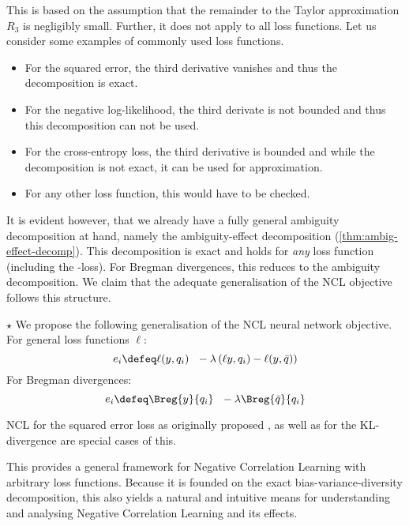 \documentclass[../main.tex]{subfiles}
\begin{document}
This is based on the assumption that the remainder to the Taylor approximation $R_{3}$ is negligibly small. Further, it does not apply to all loss functions. Let us consider some examples of commonly used loss functions.
\begin{itemize}
\item For the squared error, the third derivative vanishes and thus the decomposition is exact.
\item For the negative log-likelihood,
the third derivate is not bounded and thus this decomposition can not be used.
\item For the cross-entropy loss, 
the third derivative is bounded and while the decomposition is not exact, it can be used for approximation. %
\item For any other loss function, this would have to be checked.
\end{itemize}

It is evident however, {that we already have a fully general ambiguity decomposition at hand}, namely the ambiguity-effect decomposition (\cf \ref{thm:ambig-effect-decomp}). 
This decomposition is exact and holds for \textit{any} loss function (including the \zeroone-loss). 
For Bregman divergences, this reduces to the ambiguity decomposition.
%
We claim that the adequate generalisation of the NCL objective follows this structure.
\begin{proposition} $\star$ We propose the following generalisation of the NCL neural network objective. For general loss functions $\ell$:
$$
e_{i} \defeq \ell(y, q_{i}) ~ ~ - \lambda \left( 
 \ell y, q_{i}) - \ell(y, \bar{q})
\right)
$$
For Bregman divergences:
$$
e_{i} \defeq \Breg{y}{q_{i}} ~ ~ - \lambda  \Breg{\bar{q}}{q_{i}}
$$
\end{proposition}
NCL for the squared error loss as originally proposed \cite{liu_EnsembleLearningNegative_1999,brown_ManagingDiversityRegression_2005}, as well as for the KL-divergence \cite{webb_EnsembleNotEnsemble_2019} are special cases of this.

This provides a general framework for Negative Correlation Learning with arbitrary loss functions. Because it is founded on the exact bias-variance-diversity decomposition, this also yields a natural and intuitive means for understanding and analysing Negative Correlation Learning and its effects.
\end{document}
